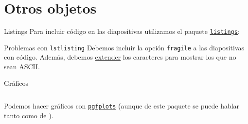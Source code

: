 \section{Otros objetos}

\begin{frame}{Listings}
  Para incluir código en las diapositivas utilizamos el paquete \href{https://www.ctan.org/tex-archive/macros/latex/contrib/listings}{\texttt{listings}}:
  \espacio
  \pause
  \begin{alertblock}{Problemas con \texttt{lstlisting}}
    Debemos incluir la opción \texttt{fragile} a las diapositivas con código.
    Además, debemos \href{http://tex.stackexchange.com/questions/24528}{extender} los caracteres para mostrar los que no sean ASCII.
  \end{alertblock}
\end{frame}

\begin{frame}{Gráficos}
\begin{columns}[c]

   Podemos hacer gráficos con \href{https://ctan.org/pkg/pgfplots}{\texttt{pgfplots}} (aunque de este paquete se puede hablar tanto como de \beamer).
  \end{columns}
\end{frame}


